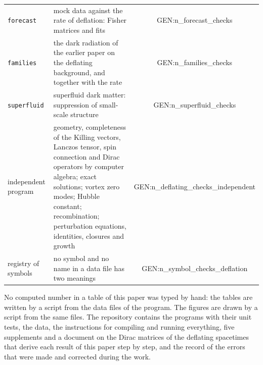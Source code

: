 \begin{table}
\begin{ruledtabular}
\begin{tabular}{lp{}c}
\texttt{forecast} & mock data against the rate of deflation: Fisher matrices and fits & {{GEN:n_forecast_checks}} \\
\texttt{families} & the dark radiation of the earlier paper on the deflating background, and together with the rate & {{GEN:n_families_checks}} \\
\texttt{superfluid} & superfluid dark matter: suppression of small-scale structure & {{GEN:n_superfluid_checks}} \\
independent program & geometry, completeness of the Killing vectors, Lanczos tensor, spin connection and Dirac operators by computer algebra; exact solutions; vortex zero modes; Hubble constant; recombination; perturbation equations, identities, closures and growth & {{GEN:n_deflating_checks_independent}} \\
registry of symbols & no symbol and no name in a data file has two meanings & {{GEN:n_symbol_checks_deflation}} \\
\end{tabular}
\end{ruledtabular}
\end{table}

No computed number in a table of this paper was typed by hand: the tables are written by a script
from the data files of the program. The figures are drawn by a script from the same files. The
repository \cite{DeflationRepo} contains the programs with their unit tests, the data, the
instructions for compiling and running everything, five supplements and a document on the Dirac
matrices of the deflating spacetimes that derive each result of this paper step by step, and the
record of the errors that were made and corrected during the work.

